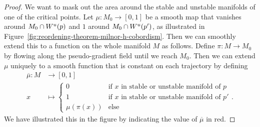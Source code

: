 \begin{proof}
    We want to mask out the area around the stable and unstable manifolds of one of the critical points.
    Let $\mu: M_0 \to  [0,1]$ be a smooth map that vanishes around  $ M_0 \cap W^u(p)$ and $1$ around $M_0 \cap W^u(p')$, as illustrated in Figure~\ref{fig:reordening-theorem-milnor-h-cobordism}.
    Then we can smoothly extend this to a function on the whole manifold $M$ as follows.
    Define $\pi: M \to  M_0$ by flowing along the pseudo-gradient field until we reach $M_0$.
    Then we can extend $\mu$ uniquely to a smooth function that is constant on each trajectory by defining
    \begin{align*}
        \overline{\mu}: M &\longrightarrow [0,1] \\
        x &\longmapsto \begin{cases}
            0 & \text{if $x$ in stable or unstable manifold of $p$}\\
            1 & \text{if $x$ in stable or unstable manifold of $p'$}\\ 
            \mu(\pi(x)) & \text{else}
        \end{cases}
    .\end{align*}
    We have illustrated this in the figure by
    indicating the value of $\overline{\mu}$ in red.


\end{proof}
